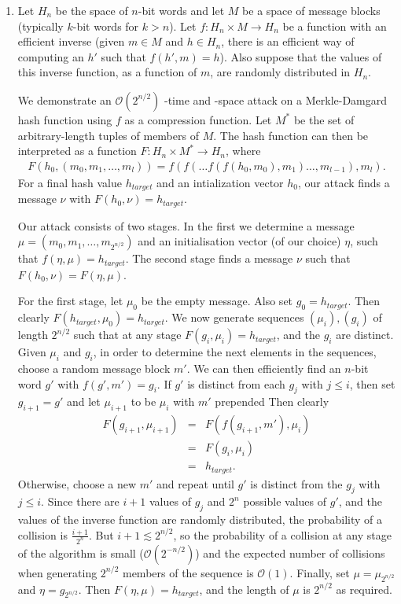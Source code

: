 \begin{enumerate}
\item Let $H_n$ be the space of $n$-bit words and let $M$ be a space of message
blocks (typically $k$-bit words for $k>n$). Let $f: H_n \times M \rightarrow H_n$
be a function with an efficient inverse (given $m \in M$ and
$h \in H_n$, there is an efficient way of computing an $h'$ such that $f(h',m)=h$).
Also suppose that the values of this inverse function, as a function of $m$,
are randomly distributed in $H_n$.

We demonstrate an $\mathcal{O}(2^{n/2})$ -time and -space attack on a
Merkle-Damgard hash function using $f$ as a compression function. Let $M^*$ be
the set of arbitrary-length tuples of members of $M$. The hash function can
then be interpreted as a function $F: H_n \times M^* \rightarrow H_n$, where
\begin{eqnarray*}
F(h_0,(m_0,m_1,\dots,m_l))=f(f(\dots f(f(h_0,m_0),m_1)\dots,m_{l-1}),m_l).
\end{eqnarray*}
For a final hash value $h_{target}$ and an intialization vector $h_0$, our attack
finds a message $\nu$ with $F(h_0,\nu)=h_{target}$.

Our attack consists of two stages. In the first we determine a message
$\mu = (m_0,m_1,\dots,m_{2^{n/2}})$ and an initialisation vector (of our choice)
$\eta$, such that $f(\eta,\mu)=h_{target}$. The second stage finds a message $\nu$
such that $F(h_0,\nu)=F(\eta,\mu)$.

For the first stage, let $\mu_0$ be the empty message. Also set $g_0=h_{target}$. Then clearly 
$F(h_{target},\mu_0)=h_{target}$. We now generate sequences $(\mu_i),(g_i)$ of length $2^{n/2}$ 
such that at any stage $F(g_i,\mu_i)=h_{target}$, and the $g_i$ are distinct.
Given $\mu_i$ and $g_i$, in order to determine the next elements in the sequences,
choose a random message block $m'$. We can then efficiently find an $n$-bit word $g'$ with
$f(g',m')=g_i$. If $g'$ is distinct from each $g_j$ with $j\le i$, then set $g_{i+1}=g'$
and let $\mu_{i+1}$ to be $\mu_i$ with $m'$ prepended Then clearly 
\begin{eqnarray*}
	F(g_{i+1},\mu_{i+1})&=&F(f(g_{i+1},m'),\mu_i)\\
																		 &=&F(g_i,\mu_i)\\
																		 &=&h_{target}.
\end{eqnarray*}
Otherwise, choose a new $m'$
and repeat until $g'$ is distinct from the $g_j$ with $j\le i$. Since there are $i+1$ values
of $g_j$ and $2^n$ possible values of $g'$,  and the values of
the inverse function are randomly distributed, the probability of a collision is $\frac{i+1}{2^n}$.
But $i+1\lesssim 2^{n/2}$, so the probability of a collision at any stage
of the algorithm is small ($\mathcal{O}(2^{-n/2})$) and the expected number of collisions
when generating $2^{n/2}$ members of the sequence is $\mathcal{O}(1)$. Finally, set $\mu = \mu_{2^{n/2}}$
and $\eta=g_{2^{n/2}}$. Then $F(\eta,\mu)=h_{target}$, and the length of $\mu$ is $2^{n/2}$ as required.


\end{enumerate}
